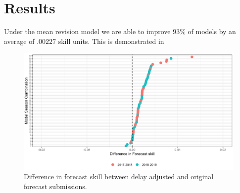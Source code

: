\documentclass{umassthesis}          %
\begin{document}
\section{Results}

Under the mean revision model we are able to improve $93\%$ of models by an average of $.00227$ skill units. This is demonstrated in 
\begin{figure}
    \centering
    \includegraphics[scale=.3]{percent_improvement.png}
    \caption{Difference in forecast skill between delay adjusted and original forecast submissions.  }
    \label{fig:my_label}
\end{figure}
\end{document}
